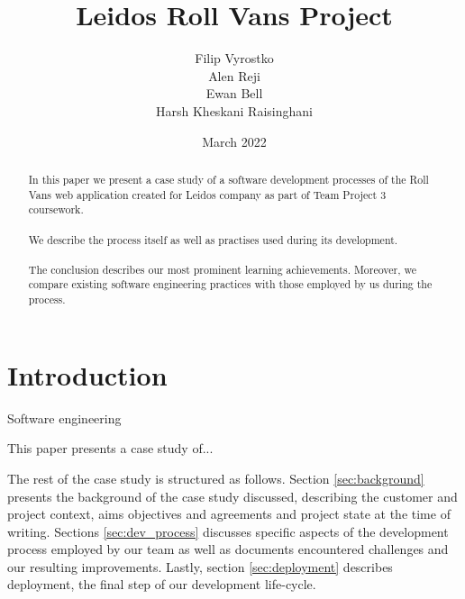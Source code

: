 \documentclass{l3proj}
\begin{document}
\title{Leidos Roll Vans Project}

\author{Filip Vyrostko \\
        Alen Reji \\
        Ewan Bell \\
        Harsh Kheskani Raisinghani}

\date{March 2022}

\maketitle

\begin{abstract}

In this paper we present a case study of a software development processes of the Roll Vans web application created for Leidos company as part of Team Project 3 coursework.\\\\
We describe the process itself as well as practises used during its development.\\\\
The conclusion describes our most prominent learning achievements. Moreover, we compare existing software engineering practices with those employed by us during the process.

\end{abstract}

\educationalconsent

\newpage

\section{Introduction}

Software engineering 

This paper presents a case study of... 


The rest of the case study is structured as follows.  Section
\ref{sec:background} presents the background of the case study
discussed, describing the customer and project context, aims
objectives and agreements and project state at the time of writing. Sections
\ref{sec:dev_process} discusses specific aspects of the development process employed by our team as well as documents encountered challenges and our resulting improvements. Lastly, section \ref{sec:deployment} describes deployment, the final step of our development life-cycle. 
\end{document}
